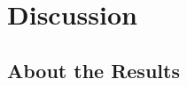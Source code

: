 \documentclass[letterpaper,11pt]{article}
\begin{document}
\newpage
\pagecolor{resblack}
\begin{figure}[H]
  \vspace*{-1.75cm}
  \caption{}
  \label{figure:cnn_res}
\end{figure}
\thispagestyle{empty} 


\newpage
\pagecolor{white}
\section{Discussion}

\subsection{About the Results}
\end{document}
